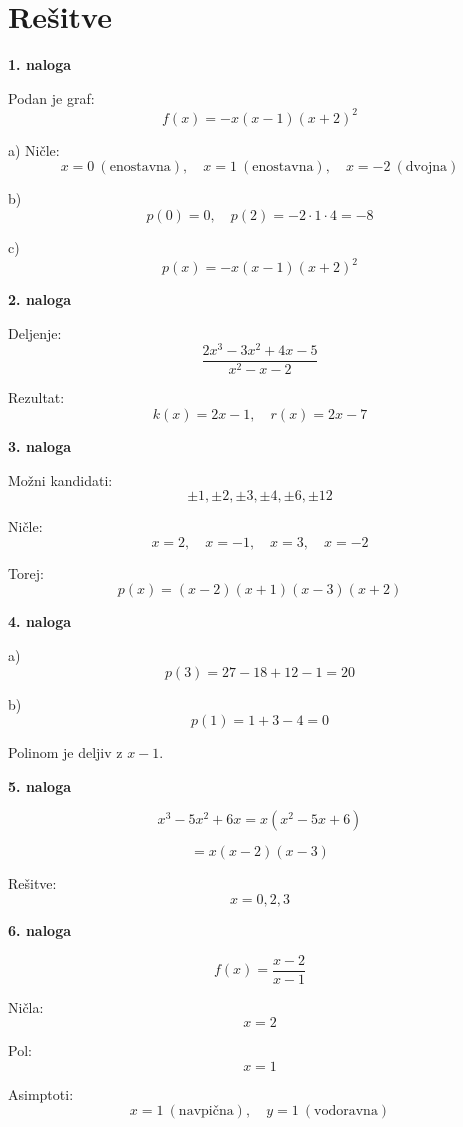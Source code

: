 \documentclass[a4paper,12pt]{letter}
\begin{document}
\vfill


\newpage

\newpage
\section*{Rešitve}

\begin{resitev}
\textbf{1. naloga}

Podan je graf:
\[
f(x) = -x(x-1)(x+2)^2
\]

a) Ničle:
\[
x=0 \ (\text{enostavna}), \quad x=1 \ (\text{enostavna}), \quad x=-2 \ (\text{dvojna})
\]

b)
\[
p(0)=0,\quad p(2)= -2\cdot1\cdot 4 = -8
\]

c)
\[
p(x) = -x(x-1)(x+2)^2
\]
\end{resitev}

\begin{resitev}
\textbf{2. naloga}

Deljenje:
\[
\frac{2x^3-3x^2+4x-5}{x^2-x-2}
\]

Rezultat:
\[
k(x)=2x-1,\quad r(x)=2x-7
\]
\end{resitev}

\begin{resitev}
\textbf{3. naloga}

Možni kandidati:
\[
\pm1,\pm2,\pm3,\pm4,\pm6,\pm12
\]

Ničle:
\[
x=2,\quad x=-1,\quad x=3,\quad x=-2
\]

Torej:
\[
p(x)=(x-2)(x+1)(x-3)(x+2)
\]
\end{resitev}

\begin{resitev}
\textbf{4. naloga}

a)
\[
p(3)=27-18+12-1=20
\]

b)
\[
p(1)=1+3-4=0
\]

Polinom je deljiv z $x-1$.
\end{resitev}

\begin{resitev}
\textbf{5. naloga}

\[
x^3-5x^2+6x = x(x^2-5x+6)
\]

\[
= x(x-2)(x-3)
\]

Rešitve:
\[
x=0,2,3
\]
\end{resitev}

\begin{resitev}
\textbf{6. naloga}

\[
f(x)=\frac{x-2}{x-1}
\]

Ničla:
\[
x=2
\]

Pol:
\[
x=1
\]

Asimptoti:
\[
x=1 \ (\text{navpična}), \quad y=1 \ (\text{vodoravna})
\]
\end{resitev}
\end{document}
